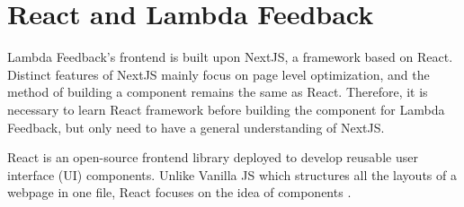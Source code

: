\documentclass[12pt,twoside]{report}
\begin{document}
\section{React and Lambda Feedback}
\label{bgIntegrationLF}
Lambda Feedback's frontend is built upon NextJS, a framework based on
React. Distinct features of NextJS mainly focus on page level
optimization, and the method of building a component remains the same as
React. Therefore, it is necessary to learn React framework
before building the component for Lambda Feedback, but only need to have a
general understanding of NextJS.

React is an open-source frontend library deployed to develop reusable user interface (UI) components. Unlike Vanilla JS which structures all the layouts of a webpage in one file, React focuses on the idea of components \cite{rawat2020reactjs}. 
\end{document}
